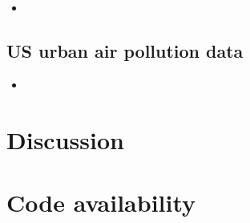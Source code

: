 \documentclass{article}
\numberwithin{equation}{section}
\begin{document}
\begin{itemize}
    \item 
\end{itemize}

\subsection{US urban air pollution data} \label{subsec:app_us}

\begin{itemize}
    \item 
\end{itemize}

\section{Discussion}

\section*{Code availability}

\newpage

\end{document}
